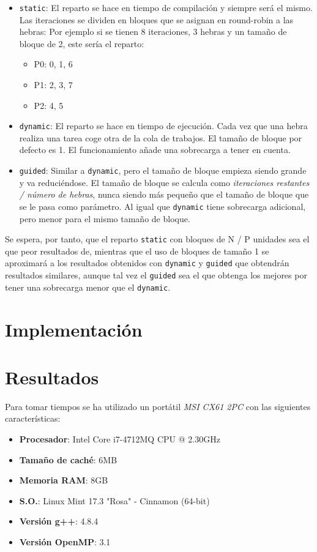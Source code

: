\begin{itemize}
	\item \texttt{static}: El reparto se hace en tiempo de compilación y siempre será el mismo. Las iteraciones se dividen en bloques que se asignan en round-robin a las hebras: Por ejemplo si se tienen 8 iteraciones, 3 hebras y un tamaño de bloque de 2, este sería el reparto:
	\begin{itemize}
		\item P0: 0, 1, 6
		\item P1: 2, 3, 7
		\item P2: 4, 5
	\end{itemize}
	\item \texttt{dynamic}: El reparto se hace en tiempo de ejecución. Cada vez que una hebra realiza una tarea coge otra de la cola de trabajos. El tamaño de bloque por defecto es 1. El funcionamiento añade una sobrecarga a tener en cuenta.
	\item \texttt{guided}: Similar a \texttt{dynamic}, pero el tamaño de bloque empieza siendo grande y va reduciéndose. El tamaño de bloque se calcula como \textit{iteraciones restantes / número de hebras}, nunca siendo más pequeño que el tamaño de bloque que se le pasa como parámetro. Al igual que \texttt{dynamic} tiene sobrecarga adicional, pero menor para el mismo tamaño de bloque.
\end{itemize}

Se espera, por tanto, que el reparto \texttt{static} con bloques de N / P unidades sea el que peor resultados de, mientras que el uso de bloques de tamaño 1 se aproximará a los resultados obtenidos con \texttt{dynamic} y \texttt{guided} que obtendrán resultados similares, aunque tal vez el \texttt{guided} sea el que obtenga los mejores por tener una sobrecarga menor que el \texttt{dynamic}.

\section{Implementación}



\section{Resultados}

Para tomar tiempos se ha utilizado un portátil \textit{MSI CX61 2PC} con las siguientes características:
\begin{itemize}
	\item \textbf{Procesador}: Intel\textregistered{} Core\texttrademark{} i7-4712MQ CPU @ 2.30GHz
	\item \textbf{Tamaño de caché}: 6MB
	\item \textbf{Memoria RAM}: 8GB
	\item \textbf{S.O.}: Linux Mint 17.3 "Rosa" - Cinnamon (64-bit)
	\item \textbf{Versión g++}: 4.8.4
	\item \textbf{Versión OpenMP}: 3.1
\end{itemize} 

